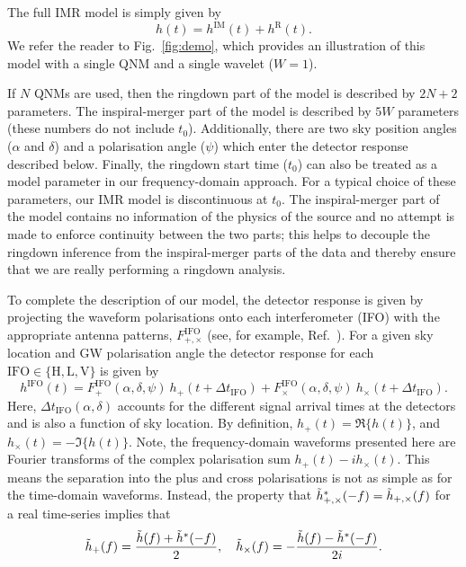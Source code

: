 The full IMR model is simply given by
\begin{equation}
	h(t) = h^\mathrm{IM}(t) + h^\mathrm{R}(t).
\end{equation}
We refer the reader to Fig.~\ref{fig:demo}, which provides an illustration of this model with a single QNM and a single wavelet ($W=1$).

If $N$ QNMs are used, then the ringdown part of the model is described by $2N+2$ parameters.
The inspiral-merger part of the model is described by $5W$ parameters (these numbers do not include $t_0$).
Additionally, there are two sky position angles ($\alpha$ and $\delta$) and a polarisation angle ($\psi$) which enter the detector response described below.
Finally, the ringdown start time ($t_0$) can also be treated as a model parameter in our frequency-domain approach.
For a typical choice of these parameters, our IMR model is discontinuous at $t_0$.
The inspiral-merger part of the model contains no information of the physics of the source and no attempt is made to enforce continuity between the two parts; this helps to decouple the ringdown inference from the inspiral-merger parts of the data and thereby ensure that we are really performing a ringdown analysis. 

To complete the description of our model, the detector response is given by projecting the waveform polarisations onto each interferometer (IFO) with the appropriate antenna patterns, $F^\mathrm{IFO}_{+,\times}$ (see, for example, Ref.~\cite{Anderson:2000yy}).
For a given sky location and GW polarisation angle the detector response for each ${\mathrm{IFO}\in \{\mathrm{H}, \mathrm{L}, \mathrm{V} \}}$ is given by
\begin{equation} \label{eq:projection_antenna}
    h^\mathrm{IFO}(t) = F^\mathrm{IFO}_+(\alpha, \delta, \psi) ~ h_+(t + \Delta t_\mathrm{IFO}) + F^\mathrm{IFO}_\times(\alpha, \delta, \psi) ~ h_\times(t + \Delta t_\mathrm{IFO}).
\end{equation}
Here, $\Delta t_\mathrm{IFO}(\alpha, \delta)$ accounts for the different signal arrival times at the detectors and is also a function of sky location.
By definition, $h_+(t) = \Re\{ h(t) \}$, and $h_\times(t) = -\Im \{ h(t) \}$.
Note, the frequency-domain waveforms presented here are Fourier transforms of the complex polarisation sum $h_+(t) - ih_\times (t)$. This means the separation into the plus and cross polarisations is not as simple as for the time-domain waveforms. Instead, the property that $\Tilde{h}^*_{+,\times}(-f) = \Tilde{h}_{+,\times}(f)$ for a real time-series implies that
\begin{equation}
    \Tilde{h}_+(f) = \frac{\Tilde{h}(f) + \Tilde{h}^*(-f)}{2}, \quad \Tilde{h}_\times(f) = -\frac{\Tilde{h}(f) - \Tilde{h}^*(-f)}{2i}.
\end{equation}


